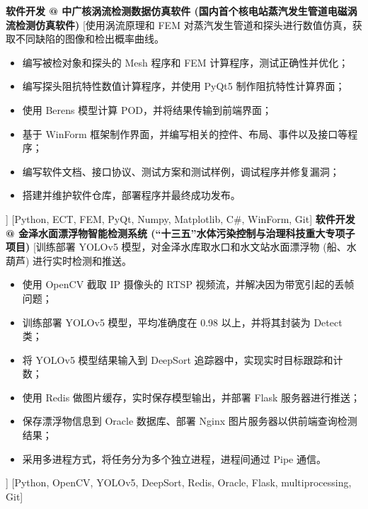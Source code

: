 \ifzh
{}
\begin{experiences}
    {\textbf{软件开发 @ 中广核涡流检测数据仿真软件 (国内首个核电站蒸汽发生管道电磁涡流检测仿真软件)}}%
    [使用涡流原理和 FEM 对蒸汽发生管道和探头进行数值仿真，获取不同缺陷的图像和检出概率曲线。
        \begin{itemize}
            \item {编写被检对象和探头的 Mesh 程序和 FEM 计算程序，测试正确性并优化；}
            \item {编写探头阻抗特性数值计算程序，并使用 PyQt5 制作阻抗特性计算界面；}
            \item {使用 Berens 模型计算 POD，并将结果传输到前端界面；}
            \item {基于 WinForm 框架制作界面，并编写相关的控件、布局、事件以及接口等程序；}
            \item {编写软件文档、接口协议、测试方案和测试样例，调试程序并修复漏洞；}
            \item {搭建并维护软件仓库，部署程序并最终成功发布。}
        \end{itemize}]
    [Python, ECT, FEM, PyQt, Numpy, Matplotlib, C\#, WinForm, Git]
    \separator{0.5ex}
    {\textbf{软件开发 @ 金泽水面漂浮物智能检测系统 (``十三五''水体污染控制与治理科技重大专项子项目)}}%
    [训练部署 YOLOv5 模型，对金泽水库取水口和水文站水面漂浮物 (船、水葫芦) 进行实时检测和推送。
        \begin{itemize}
            \item {使用 OpenCV 截取 IP 摄像头的 RTSP 视频流，并解决因为带宽引起的丢帧问题；}
            \item {训练部署 YOLOv5 模型，平均准确度在 0.98 以上，并将其封装为 Detect 类；}
            \item {将 YOLOv5 模型结果输入到 DeepSort 追踪器中，实现实时目标跟踪和计数；}
            \item {使用 Redis 做图片缓存，实时保存模型输出，并部署 Flask 服务器进行推送；}
            \item {保存漂浮物信息到 Oracle 数据库、部署 Nginx 图片服务器以供前端查询检测结果；}
            \item {采用多进程方式，将任务分为多个独立进程，进程间通过 Pipe 通信。}
        \end{itemize}]
    [Python, OpenCV, YOLOv5, DeepSort, Redis, Oracle, Flask, multiprocessing, Git]
\end{experiences}
